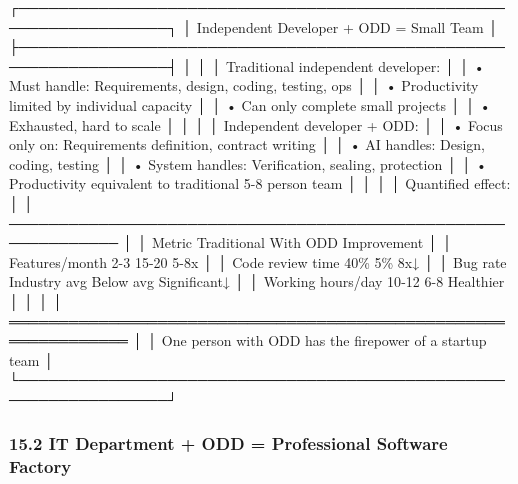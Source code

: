 \documentclass[
]{article}
\newenvironment{Shaded}{}{}
\newcommand{\NormalTok}[1]{#1}
\begin{document}
\begin{Shaded}
\begin{Highlighting}[]
\NormalTok{┌─────────────────────────────────────────────────────────────────┐}
\NormalTok{│          Independent Developer + ODD = Small Team                │}
\NormalTok{├─────────────────────────────────────────────────────────────────┤}
\NormalTok{│                                                                  │}
\NormalTok{│  Traditional independent developer:                             │}
\NormalTok{│  • Must handle: Requirements, design, coding, testing, ops      │}
\NormalTok{│  • Productivity limited by individual capacity                  │}
\NormalTok{│  • Can only complete small projects                             │}
\NormalTok{│  • Exhausted, hard to scale                                     │}
\NormalTok{│                                                                  │}
\NormalTok{│  Independent developer + ODD:                                   │}
\NormalTok{│  • Focus only on: Requirements definition, contract writing     │}
\NormalTok{│  • AI handles: Design, coding, testing                          │}
\NormalTok{│  • System handles: Verification, sealing, protection            │}
\NormalTok{│  • Productivity equivalent to traditional 5{-}8 person team       │}
\NormalTok{│                                                                  │}
\NormalTok{│  Quantified effect:                                             │}
\NormalTok{│  ─────────────────────────────────────────────────────────────  │}
\NormalTok{│  Metric              Traditional    With ODD       Improvement  │}
\NormalTok{│  Features/month      2{-}3            15{-}20          5{-}8x         │}
\NormalTok{│  Code review time    40\%            5\%             8x↓          │}
\NormalTok{│  Bug rate            Industry avg   Below avg      Significant↓ │}
\NormalTok{│  Working hours/day   10{-}12          6{-}8            Healthier    │}
\NormalTok{│                                                                  │}
\NormalTok{│  ══════════════════════════════════════════════════════════════  │}
\NormalTok{│  One person with ODD has the firepower of a startup team        │}
\NormalTok{└─────────────────────────────────────────────────────────────────┘}
\end{Highlighting}
\end{Shaded}

\hypertarget{152-it-department-+-odd-=-professional-software-factory}{%
\subsubsection{15.2 IT Department + ODD = Professional Software
Factory}\label{152-it-department-+-odd-=-professional-software-factory}}
\end{document}
